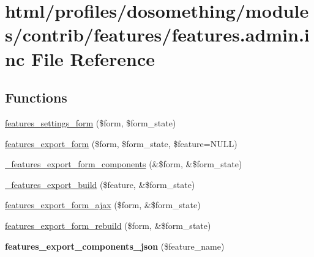 \hypertarget{features_8admin_8inc}{
\section{html/profiles/dosomething/modules/contrib/features/features.admin.inc File Reference}
\label{features_8admin_8inc}
}
\subsection*{Functions}
\begin{DoxyCompactItemize}
\item 
\hyperlink{features_8admin_8inc_a13fe0f65db94a521da4528594b4b6a04}{features\_\-settings\_\-form} (\$form, \$form\_\-state)
\item 
\hyperlink{group__forms_gac6d72d74ab676748b1197536446c1063}{features\_\-export\_\-form} (\$form, \$form\_\-state, \$feature=NULL)
\item 
\hyperlink{features_8admin_8inc_a1ac3eccd6829e3c5388179a22bdb9817}{\_\-features\_\-export\_\-form\_\-components} (\&\$form, \&\$form\_\-state)
\item 
\hyperlink{features_8admin_8inc_ae49cf45c928b2cf3a06100fce2021f4a}{\_\-features\_\-export\_\-build} (\$feature, \&\$form\_\-state)
\item 
\hyperlink{features_8admin_8inc_a0c79652184d03c394b6bccba1704d93d}{features\_\-export\_\-form\_\-ajax} (\$form, \&\$form\_\-state)
\item 
\hyperlink{features_8admin_8inc_a9d25b511fe410f560211cfa78edb08c2}{features\_\-export\_\-form\_\-rebuild} (\$form, \&\$form\_\-state)
\item 
\hypertarget{features_8admin_8inc_a29546f8ce6c126fdf9ccaae629a9962c}{
{\bfseries features\_\-export\_\-components\_\-json} (\$feature\_\-name)}
\label{features_8admin_8inc_a29546f8ce6c126fdf9ccaae629a9962c}


\end{DoxyCompactItemize}
